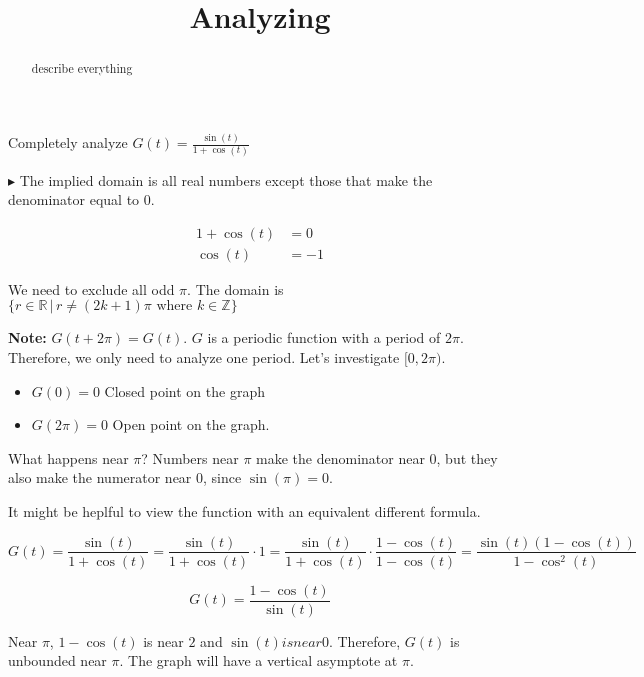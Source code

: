 \documentclass{ximera}
\title{Analyzing}
\begin{document}
\begin{abstract}
describe everything
\end{abstract}
\maketitle







Completely analyze $G(t) = \frac{\sin(t)}{1 + \cos(t)}$

$\blacktriangleright$  The implied domain is all real numbers except those that make the denominator equal to $0$.



\begin{align*}
1  + \cos(t) & = 0 \\
\cos(t) & = -1
\end{align*}


We need to exclude all odd $\pi$.  The domain is $\{  r \in \mathbb{R} \, | \, r \ne (2k+1)\pi \text{ where } k \in \mathbb{Z}   \}$



\textbf{Note:} $G(t+2\pi) = G(t)$.  $G$ is a periodic function with a period of $2\pi$.  Therefore, we only need to analyze one period.  Let's investigate $[0, 2\pi)$.

\begin{itemize}
\item $G(0) = 0$   Closed point on the graph
\item $G(2\pi) = 0$  Open point on the graph.
\end{itemize}




What happens near $\pi$?  Numbers near $\pi$ make the denominator near $0$, but they also make the numerator near $0$, since $\sin(\pi)=0$.

It might be heplful to view the function with an equivalent different formula.


\[   G(t) = \frac{\sin(t)}{1 + \cos(t)}  = \frac{\sin(t)}{1 + \cos(t)}  \cdot 1 = \frac{\sin(t)}{1 + \cos(t)}  \cdot \frac{1-\cos(t)}{1-\cos(t)} = \frac{\sin(t) (1-\cos(t))}{1-\cos^2(t)}    \]



\[    G(t) = \frac{1-\cos(t)}{\sin(t)}  \]


Near $\pi$, $1-\cos(t)$ is near $2$ and $\sin(t) is near 0$.  Therefore, $G(t)$ is unbounded near $\pi$.  The graph will have a vertical asymptote at $\pi$.
\end{document}
